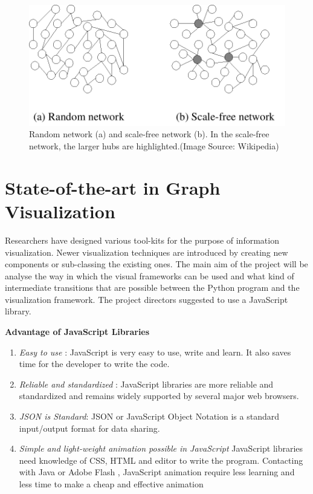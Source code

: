 \begin{figure}[H]
\centering
\includegraphics[scale=0.4]{sclaran.png}
\caption{ \label{ranfig} Random network (a) and scale-free network (b). In the scale-free network, the larger hubs are highlighted.(Image Source: Wikipedia)}
\end{figure}

\section{State-of-the-art in Graph Visualization}
Researchers have designed various tool-kits for the purpose of information visualization. Newer visualization techniques are introduced by creating new components or sub-classing the existing ones. The main aim of the project will be analyse the way in which the visual frameworks can be used and what kind of intermediate transitions that are possible between the Python program and the visualization framework. The project directors suggested to use a JavaScript library.

\textbf{Advantage of JavaScript Libraries} \cite{graphjslib}
\begin{enumerate}
\item \textit{Easy to use} : JavaScript is very easy to use, write and learn. It also saves time for the developer to write the code.
\item \textit{Reliable and standardized} : JavaScript libraries are more reliable and standardized and remains widely supported by several major web browsers. 
\item \textit{JSON is Standard}: JSON or JavaScript Object Notation is a standard input/output format for data sharing.
\item \textit{Simple and light-weight animation possible in JavaScript} JavaScript libraries need knowledge of CSS, HTML and editor to write the program. Contacting with Java or Adobe Flash , JavaScript animation require less learning and less time to make a cheap and effective animation 
\end{enumerate}

